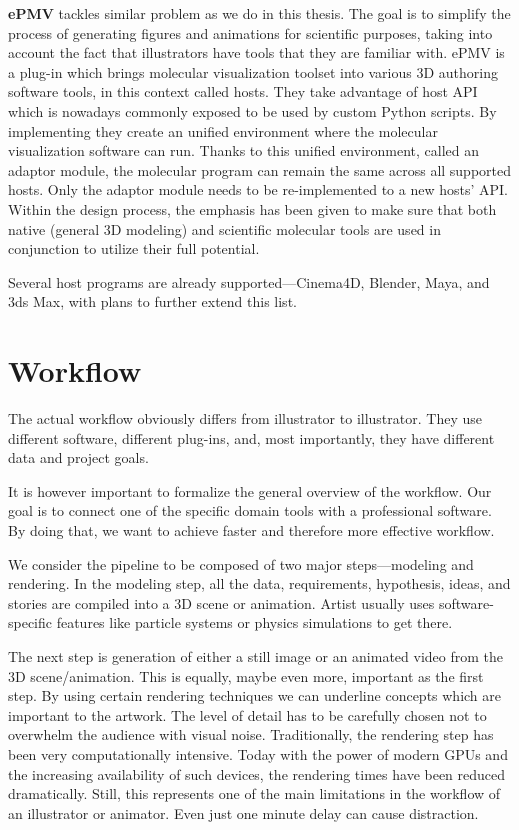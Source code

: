 \documentclass[
  digital, %
  table,   %
  nolof,     %
  nolot,     %
  oneside,
]{fithesis3}
\begin{document}
\textbf{ePMV} \cite{ePMV} tackles similar problem as we do in this thesis. The goal is to simplify the process of generating figures and animations for scientific purposes, taking into account the fact that illustrators have tools that they are familiar with. ePMV is a plug-in which brings molecular visualization toolset into various 3D authoring software tools, in this context called hosts. They take advantage of host API which is nowadays commonly exposed to be used by custom Python scripts. By implementing they create an unified environment where the molecular visualization software can run. Thanks to this unified environment, called an adaptor module, the molecular program can remain the same across all supported hosts. Only the adaptor module needs to be re-implemented to a new hosts' API. Within the design process, the emphasis has been given to make sure that both native (general 3D modeling) and scientific molecular tools are used in conjunction to utilize their full potential.

Several host programs are already supported—Cinema4D, Blender, Maya, and 3ds Max, with plans to further extend this list.

\section{Workflow}
The actual workflow obviously differs from illustrator to illustrator. They use different software, different plug-ins, and, most importantly, they have different data and project goals.

It is however important to formalize the general overview of the workflow. Our goal is to connect one of the specific domain tools with a professional software. By doing that, we want to achieve faster and therefore more effective workflow.

We consider the pipeline to be composed of two major steps—modeling and rendering. In the modeling step, all the data, requirements, hypothesis, ideas, and stories are compiled into a 3D scene or animation. Artist usually uses software-specific features like particle systems or physics simulations to get there.

The next step is generation of either a still image or an animated video from the 3D scene/animation. This is equally, maybe even more, important as the first step. By using certain rendering techniques we can underline concepts which are important to the artwork. The level of detail has to be carefully chosen not to overwhelm the audience with visual noise. Traditionally, the rendering step has been very computationally intensive. Today with the power of modern GPUs and the increasing availability of such devices, the rendering times have been reduced dramatically. Still, this represents one of the main limitations in the workflow of an illustrator or animator. Even just one minute delay can cause distraction.
\end{document}
